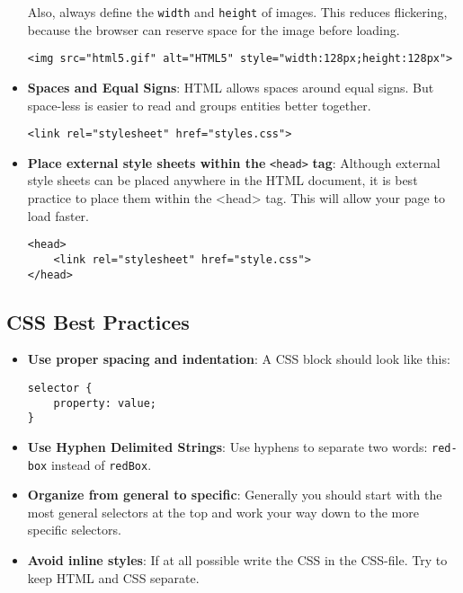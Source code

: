 \documentclass[11pt,a4paper]{report}
\newcommand{\bfb}[1]{{\bf \color{blue} #1}}
\begin{document}
\begin{itemize}
Also, always define the \verb|width| and \verb|height| of images. This reduces flickering, because the browser can reserve space for the image before loading.
\begin{lstlisting}[style=htmlcssjs]
<img src="html5.gif" alt="HTML5" style="width:128px;height:128px">
\end{lstlisting}

\item \bfb{Spaces and Equal Signs}: HTML allows spaces around equal signs. But space-less is easier to read and groups entities better together.

\begin{lstlisting}[style=htmlcssjs]
<link rel="stylesheet" href="styles.css">
\end{lstlisting}

\item \bfb{Place external style sheets within the} \verb|<head>| \bfb{tag}: Although external style sheets can be placed anywhere in the HTML document, it is best practice to place them within the <head> tag. This will allow your page to load faster.

\begin{lstlisting}[style=htmlcssjs]
<head>
    <link rel="stylesheet" href="style.css">
</head>
\end{lstlisting}


\end{itemize}


\subsection{CSS Best Practices}

\begin{itemize}
\item \bfb{Use proper spacing and indentation}: A CSS block should look like this:
\begin{lstlisting}[style=htmlcssjs]
selector {
    property: value;
}
\end{lstlisting}


\item \bfb{Use Hyphen Delimited Strings}: Use hyphens to separate two words: \verb|red-box| instead of \verb|redBox|. 

\item \bfb{Organize from general to specific}: Generally you should start with the most general selectors at the top and work your way down to the more specific selectors.  

\item \bfb{Avoid inline styles}: If at all possible write the CSS in the CSS-file. Try to keep HTML and CSS separate.
\end{itemize}
\end{document}
